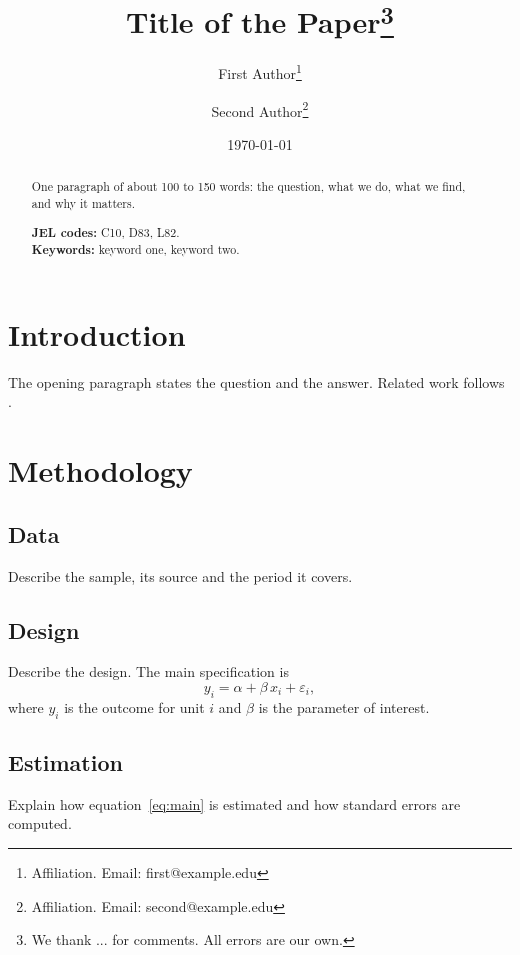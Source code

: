 \documentclass[12pt]{article}
\title{Title of the Paper\thanks{We thank ... for comments. All errors are our own.}}
\author{First Author\thanks{Affiliation. Email: first@example.edu}
  \and Second Author\thanks{Affiliation. Email: second@example.edu}}
\date{\today}
\begin{document}
\maketitle
\thispagestyle{empty}

\begin{abstract}
\noindent One paragraph of about 100 to 150 words: the question, what we do, what we find, and why it matters.

\medskip
\noindent\textbf{JEL codes:} C10, D83, L82.\\
\noindent\textbf{Keywords:} keyword one, keyword two.
\end{abstract}
\clearpage
{}

\section{Introduction}\label{sec:intro}

The opening paragraph states the question and the answer. Related work follows \citet{author2020}.

\section{Methodology}\label{sec:method}

\subsection{Data}\label{sec:data}

Describe the sample, its source and the period it covers.

\subsection{Design}\label{sec:design}

Describe the design. The main specification is
\begin{equation}\label{eq:main}
  y_{i} = \alpha + \beta\, x_{i} + \varepsilon_{i},
\end{equation}
where $y_i$ is the outcome for unit $i$ and $\beta$ is the parameter of interest.

\subsection{Estimation}\label{sec:estimation}

Explain how equation~\eqref{eq:main} is estimated and how standard errors are computed.
\end{document}
